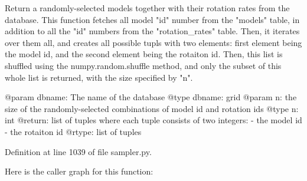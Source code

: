 \begin{DoxyVerb}Return a randomly-selected models together with their rotation rates from the database.
This function fetches all model "id" number from the "models" table, in addition to all the "id"
numbers from the "rotation_rates" table. Then, it iterates over them all, and creates all possible
tupls with two elements: first element being the model id, and the second element being the rotaiton
id. Then, this list is shuffled using the numpy.random.shuffle method, and only the subset of this
whole list is returned, with the size specified by "n".

@param dbname: The name of the database
@type dbname: grid
@param n: the size of the randomly-selected combinations of model id and rotation ids
@type n: int
@return: list of tuples where each tuple consists of two integers: 
   - the model id
   - the rotaiton id
@rtype: list of tuples
\end{DoxyVerb}
 

Definition at line 1039 of file sampler.\+py.

Here is the caller graph for this function\+:

